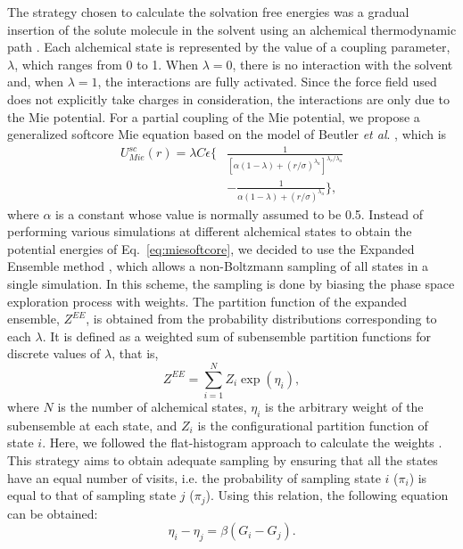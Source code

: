 \documentclass[preprint]{elsarticle}
\begin{document}
	The strategy chosen to calculate the solvation free energies was a gradual insertion of the solute molecule in the solvent using an alchemical thermodynamic path \cite{klimovich}. Each alchemical state is represented by the value of a coupling parameter, $\lambda$, which ranges from 0 to 1. When $\lambda=0$, there is no interaction with the solvent and, when $\lambda=1$, the interactions are fully activated. Since the force field used does not explicitly take charges in consideration, the interactions are only due to the Mie potential. For a partial coupling of the Mie potential, we propose a generalized softcore Mie equation based on the model of Beutler \textit{et al}. \cite{beutler}, which is
	\begin{equation}
	\label{eq:miesoftcore}
	\begin{aligned}
	U_{Mie}^{sc}(r) = \lambda C \epsilon \Bigg\lbrace & \frac{1}{\left[\alpha(1-\lambda)+ (r/\sigma)^{\lambda_a}\right]^{\lambda_{r}/\lambda_{a}}} \\ &-\frac{1}{\alpha(1-\lambda)+(r/\sigma)^{\lambda_a}} \Bigg\rbrace,
	\end{aligned}
	\end{equation}
	where $\alpha$ is a constant whose value is normally assumed to be 0.5. Instead of performing various simulations at different alchemical states to obtain the potential energies of Eq.~\eqref{eq:miesoftcore}, we decided to use the Expanded Ensemble method \cite{lyubartsev}, which allows a non-Boltzmann sampling of all states in a single simulation. In this scheme, the sampling is done by biasing the phase space exploration process with weights. The partition function of the expanded ensemble, $Z^{EE}$, is obtained from the probability distributions corresponding to each $\lambda$. It is defined as a weighted sum of subensemble partition functions for discrete values of $\lambda$, that is,
	\begin{equation}
	Z^{EE} = \sum_{i=1}^{N} Z_{i} \exp(\eta_{i}),
	\label{ee}
	\end{equation}
	where $N$ is the number of alchemical states, $\eta_i$ is the arbitrary weight of the subensemble at each state, and $Z_{i}$ is the configurational partition function of state $i$. Here, we followed the flat-histogram approach to calculate the weights \cite{lyubartsev}. This strategy aims to obtain adequate sampling by ensuring that all the states have an equal number of visits, i.e. the probability of sampling state $i$ ($\pi_{i}$) is equal to that of sampling state $j$ ($\pi_{j}$). Using this relation, the following equation can be obtained:
	\begin{equation}
	\label{eqn:weight}
	\eta_{i} - \eta_{j} = \beta (G_i-G_j).
	\end{equation}
	
\end{document}
